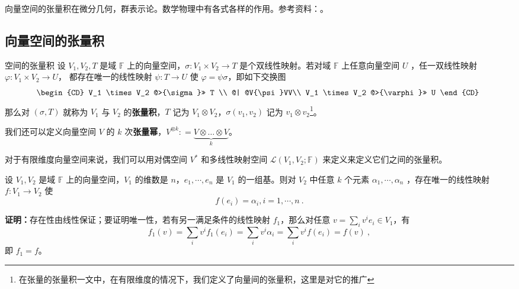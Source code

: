 
\begin{issues}
\end{issues}


向量空间的张量积在微分几何，群表示论。数学物理中有各式各样的作用。参考资料：\cite{聂丁代数学引论}\cite{柯代数学引论}。

\subsection{向量空间的张量积}
\begin{definition}{空间的张量积}\label{def_TPofSp_1}
设 $V_1, V_2,T$ 是域 $\mathbb F$ 上的向量空间，$\sigma: V_1 \times V_2 \rightarrow T$ 是个双线性映射。若对域 $\mathbb F$ 上任意向量空间 $U$ ，任一双线性映射 $\varphi:V_1\times V_2\rightarrow U$， 都存在唯一的线性映射 $\psi:T\rightarrow U$ 使 $\varphi=\psi\sigma$，即如下交换图
\begin{equation}
\begin{CD}
V_1 \times V_2 @>{\sigma}>> T \\
@| @V{\psi}VV\\
V_1 \times V_2 @>{\varphi}>> U
\end{CD}~
\end{equation}
那么对 $(\sigma, T)$ 就称为 $V_1$ 与 $V_2$ 的\textbf{张量积}，$T$ 记为 $V_1 \otimes V_2$，$\sigma(v_1, v_2)$ 记为 $v_1 \otimes v_2$\footnote{在张量的张量积一文中，在有限维度的情况下，我们定义了向量间的张量积，这里是对它的推广}。

我们还可以定义向量空间 $V$ 的 $k$ 次\textbf{张量幂}，$V^{\otimes k}: = \underbrace{V \otimes \dots \otimes V}_k$。
\end{definition}

对于有限维度向量空间来说，我们可以用对偶空间 $V^*$ 和多线性映射空间 $\mathcal L(V_1,V_2;\mathbb F)$ 来定义来定义它们之间的张量积。

\begin{lemma}{}\label{lem_TPofSp_2}
设 $V_1,V_2$ 是域 $\mathbb F$ 上的向量空间，$V_1$ 的维数是 $n$，$e_1,\cdots,e_n$ 是 $V_1$ 的一组基。则对 $V_2$ 中任意 $k$ 个元素 $\alpha_1,\cdots,\alpha_n$ ，存在唯一的线性映射 $f: V_1 \rightarrow V_2$ 使
\begin{equation}
f(e_i)=\alpha_i, i=1, \cdots, n~.
\end{equation}
\end{lemma}
\textbf{证明：}存在性由线性保证；要证明唯一性，若有另一满足条件的线性映射 $f_1$，那么对任意 $v=\sum\limits_{i}v^ie_i\in V_1$，有
\begin{equation}
f_1(v)=\sum_{i}v^if_1(e_i)=\sum_{i}v^i\alpha_i=\sum_{i}v^if(e_i)=f(v)~,
\end{equation}
即 $f_1=f$。

